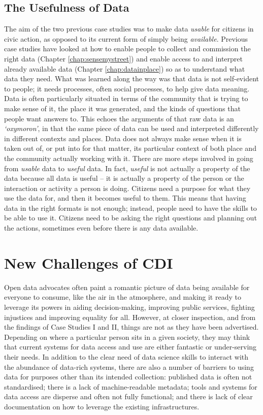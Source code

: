 \subsection{The Usefulness of Data}
\label{sub:useful_data}
The aim of the two previous case studies was to make data \textit{usable} for citizens in civic action, as opposed to its current form of simply being \textit{available}. Previous case studies have looked at how to enable people to collect and commission the right data (Chapter \ref{chap:sensemystreet}) and enable access to and interpret already available data (Chapter \ref{chap:datainplace}) so as to understand what data they need. What was learned along the way was that data is not self-evident \citep{tuomi_data_1999,gitelman_raw_2013} to people; it needs processes, often social processes, to help give data meaning. Data is often particularly situated in terms of the community that is trying to make sense of it, the place it was generated, and the kinds of questions that people want answers to. This echoes the arguments of \citet{gitelman_raw_2013} that raw data is an \textit{`oxymoron'}, in that the same piece of data can be used and interpreted differently in different contexts and places. Data does not always make sense when it is taken out of, or put into for that matter, its particular context of both place and the community actually working with it. There are more steps involved in going from \textit{usable} data to \textit{useful} data. In fact, \textit{useful} is not actually a property of the data because all data is useful -- it is actually a property of the person or the interaction or activity a person is doing. Citizens need a purpose for what they use the data for, and then it becomes useful to them. This means that having data in the right formats is not enough; instead, people need to have the skills to be able to use it. Citizens need to be asking the right questions and planning out the actions, sometimes even before there is any data available.

\section{New Challenges of CDI}
\label{sec:new_challenges}
Open data advocates often paint a romantic picture of data being available for everyone to consume, like the air in the atmosphere, and making it ready to leverage its powers in aiding decision-making, improving public services, fighting injustices and improving equality for all. However, at closer inspection, and from the findings of Case Studies I and II, things are not as they have been advertised. Depending on where a particular person sits in a given society, they may think that current systems for data access and use are either fantastic or under-serving their needs. In addition to the clear need of data science skills to interact with the abundance of data-rich systems, there are also a number of barriers to using data for purposes other than its intended collection: published data is often not standardised; there is a lack of machine-readable metadata; tools and systems for data access are disperse and often not fully functional; and there is lack of clear documentation on how to leverage the existing infrastructures.

